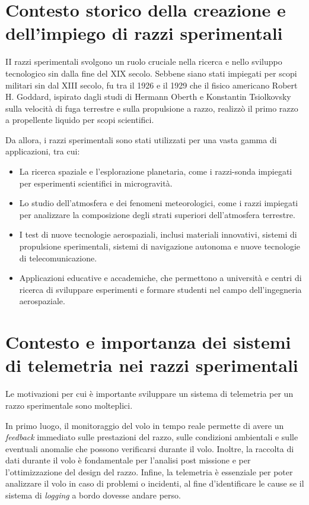 \documentclass[12pt,a4paper,twoside]{book}
\begin{document}
\section{Contesto storico della creazione e dell'impiego di razzi sperimentali}
II razzi sperimentali svolgono un ruolo cruciale nella ricerca e nello sviluppo
tecnologico sin dalla fine del XIX secolo.
Sebbene siano stati impiegati per scopi militari sin dal XIII secolo, fu tra il
1926 e il 1929 che il fisico americano Robert H. Goddard, ispirato dagli studi
di Hermann Oberth e Konstantin Tsiolkovsky sulla velocità di fuga terrestre e
sulla propulsione a razzo, realizzò il primo razzo a propellente liquido per
scopi scientifici\cite{seibert2006history}.

Da allora, i razzi sperimentali sono stati utilizzati per una vasta gamma di
applicazioni, tra cui:
\begin{itemize}
    \item La ricerca spaziale e l’esplorazione planetaria, come i razzi-sonda
          impiegati per esperimenti scientifici in microgravità.
    \item Lo studio dell’atmosfera e dei fenomeni meteorologici, come i razzi
          impiegati per analizzare la composizione degli strati superiori
          dell’atmosfera terrestre.
    \item I test di nuove tecnologie aerospaziali, inclusi materiali innovativi,
          sistemi di propulsione sperimentali, sistemi di navigazione autonoma e
          nuove tecnologie di telecomunicazione.
    \item Applicazioni educative e accademiche, che permettono a università e
          centri di ricerca di sviluppare esperimenti e formare studenti nel campo
          dell’ingegneria aerospaziale.
\end{itemize}

\section{Contesto e importanza dei sistemi di telemetria nei razzi sperimentali}
Le motivazioni per cui \`e importante sviluppare un sistema di telemetria per un
razzo sperimentale sono molteplici.

In primo luogo, il monitoraggio del volo in tempo reale permette di avere un
\emph{feedback} immediato sulle prestazioni del razzo, sulle condizioni
ambientali e sulle eventuali anomalie che possono verificarsi durante il volo.
Inoltre, la raccolta di dati durante il volo \`e fondamentale per l’analisi
post missione e per l’ottimizzazione del design del razzo.
Infine, la telemetria \`e essenziale per poter analizzare il volo in caso di
problemi o incidenti, al fine d'identificare le cause se il sistema di
\emph{logging} a bordo dovesse andare perso.
\end{document}
